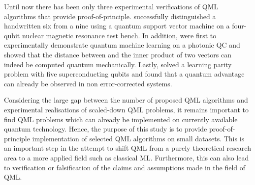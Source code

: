 \documentclass[a4paper]{article}
\newcommand*{\0}{$\ket{0}$}
\newcommand*{\1}{$\ket{1}$}
\begin{document}
Until now there has been only three experimental verifications of QML algorithms that provide proof-of-principle. \cite{Li2015} successfully distinguished a handwritten six from a nine using a quantum support vector machine on a four-qubit nuclear magnetic resonance test bench. In addition, \cite{Cai2015} were first to experimentally demonstrate quantum machine learning on a photonic QC and showed that the distance between and the inner product of two vectors can indeed be computed quantum mechanically. Lastly, \cite{Riste2015} solved a learning parity problem with five superconducting qubits and found that a quantum advantage can already be observed in non error-corrected systems.

Considering the large gap between the number of proposed QML algorithms and experimental realisations of scaled-down QML problems, it remains important to find QML problems which can already be implemented on currently available quantum technology. Hence, the purpose of this study is to provide proof-of-principle implementation of selected QML algorithms on small datasets. This is an important step in the attempt to shift QML from a purely theoretical research area to a more applied field such as classical ML. Furthermore, this can also lead to verification or falsification of the claims and assumptions made in the field of QML. 


\end{document}
